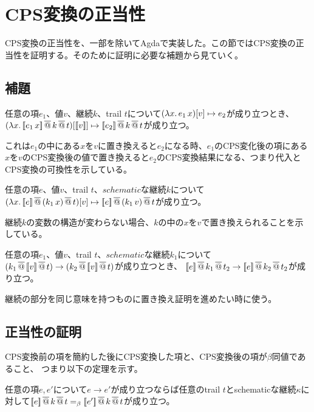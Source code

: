 \section{CPS変換の正当性}
CPS変換の正当性を、一部を除いてAgdaで実装した。この節ではCPS変換の正当性を証明する。そのために証明に必要な補題から見ていく。
\subsection{補題}
\begin{lemma}[CPS変換と代入の可換性]
  任意の項$e_1$、値$v$、継続$k$、trail $t$について$(\lambda{x}.\,{e_1\,x})[v]\mapsto e_2$が成り立つとき、$(\lambda{x}.\,{[\![{e_1\,x}]\!] \,\overline{@}\, k \,\overline{@}\, t})[[\![{v}]\!]] \mapsto [\![{e_2}]\!] \,\overline{@}\, k \,\overline{@}\, t$が成り立つ。
\end{lemma}
これは$e_1$の中にある$x$を$v$に置き換えると$e_2$になる時、$e_1$のCPS変化後の項にある$x$を$v$のCPS変換後の値で置き換えると$e_2$のCPS変換結果になる、つまり代入とCPS変換の可換性を示している。

\begin{lemma}[継続に関する代入演算]
  任意の項$e$、値$v$、trail $t$、$schematic$な継続$k$について\\
  $(\lambda{x}.\,{[\![{e}]\!] \,\overline{@}\, (k_1\, x) \,\overline{@}\, t})[v] \mapsto [\![{e}]\!] \,\overline{@}\, (k_1\,v) \,\overline{@}\, t$が成り立つ。
\end{lemma}
継続$k$の変数の構造が変わらない場合、$k$の中の$x$を$v$で置き換えられることを示している。

\begin{lemma}[継続の簡約に関する補題]
  任意の項$e_1$、値$v$、trail $t$、$schematic$な継続$k_1$について\\
  $(k_1 \,\overline{@}\, [\![{v}]\!] \,\overline{@}\, t) \to (k_2 \,\overline{@}\, [\![{v}]\!] \,\overline{@}\, t)$が成り立つとき、
  $[\![{e}]\!]\,\overline{@}\, k_1 \,\overline{@}\, t_2 \to [\![{e}]\!]\,\overline{@}\, k_2 \,\overline{@}\, t_2$が成り立つ。
\end{lemma}
継続の部分を同じ意味を持つものに置き換え証明を進めたい時に使う。

\subsection{正当性の証明}
CPS変換前の項を簡約した後にCPS変換した項と、CPS変換後の項が$\beta$同値であること、
つまり以下の定理を示す。
\begin{theorem}[正当性の証明]
  任意の項$e$,$\, e'$について$e \to e'$が成り立つならば任意のtrail $t$とschematicな継続$\kappa$に対して$[\![{e}]\!]\,\overline{@}\, k \,\overline{@}\, t =_{\beta} [\![{e'}]\!] \,\overline{@}\, k \,\overline{@}\, t$が成り立つ。
\end{theorem}

